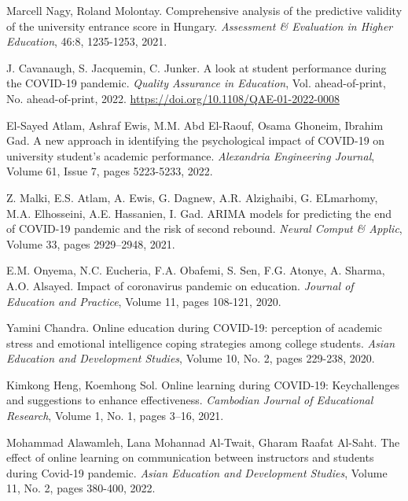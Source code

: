 \documentclass[12pt]{article}
\begin{document}
\begin{thebibliography}{9}
Marcell Nagy, Roland Molontay. Comprehensive analysis of the predictive validity of the university entrance score in Hungary. \textit{Assessment \& Evaluation in Higher Education}, 46:8, 1235-1253, 2021.

J. Cavanaugh, S. Jacquemin, C. Junker. A look at student performance during the COVID-19 pandemic. \textit{Quality Assurance in Education}, Vol. ahead-of-print,  No. ahead-of-print, 2022. \url{https://doi.org/10.1108/QAE-01-2022-0008}


El-Sayed Atlam, Ashraf Ewis, M.M. Abd El-Raouf, Osama Ghoneim, Ibrahim Gad. A new approach in identifying the psychological impact of COVID-19 on university student’s academic performance. \textit{Alexandria Engineering Journal}, Volume 61, Issue 7, pages 5223-5233, 2022.

Z. Malki, E.S. Atlam, A. Ewis, G. Dagnew, A.R. Alzighaibi, G. ELmarhomy, M.A. Elhosseini, A.E. Hassanien, I. Gad.
ARIMA models for predicting the end of COVID-19 pandemic and the risk of second rebound. \textit{Neural Comput \& Applic}, Volume 33, pages 2929–2948, 2021.

E.M. Onyema, N.C. Eucheria, F.A. Obafemi, S. Sen, F.G. Atonye, A. Sharma, A.O. Alsayed. Impact of coronavirus pandemic on education. \textit{Journal of Education and Practice}, Volume 11, pages 108-121, 2020.

Yamini Chandra. Online education during COVID-19: perception of academic stress and emotional intelligence coping strategies among college students. \textit{Asian Education and Development Studies}, Volume 10, No. 2, pages 229-238, 2020.

Kimkong Heng, Koemhong Sol. Online learning during COVID-19: Keychallenges and suggestions to enhance effectiveness. \textit{Cambodian Journal of Educational Research}, Volume 1, No. 1, pages 3–16, 2021.

Mohammad Alawamleh, Lana Mohannad Al-Twait, Gharam Raafat Al-Saht. The effect of online learning on communication between instructors and students during Covid-19 pandemic. \textit{Asian Education and Development Studies}, Volume 11, No. 2, pages 380-400, 2022.


\end{thebibliography}
\end{document}
